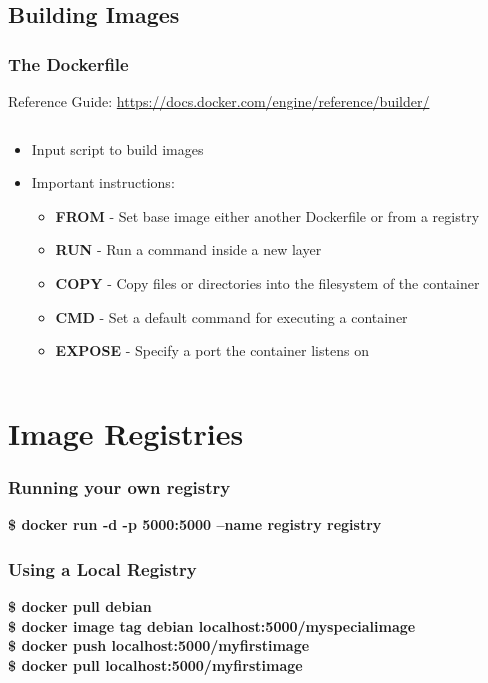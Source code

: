 \documentclass[aspectratio=169,11pt,hyperref={colorlinks=true}]{beamer}
\begin{document}
\subsection{Building Images}
\begin{frame}
    \frametitle{The Dockerfile}
    Reference Guide: \href{https://docs.docker.com/engine/reference/builder/}{https://docs.docker.com/engine/reference/builder/}
    \begin{columns}[T]
        \begin{column}{.41\textwidth}
            \begin{itemize}
                \item Input script to build images
                \item Important instructions:
                \begin{itemize}
                    \item \textbf{FROM} - Set base image either another Dockerfile or from a registry
                    \item \textbf{RUN} - Run a command inside a new layer
                    \item \textbf{COPY} - Copy files or directories into the filesystem of the container
                    \item \textbf{CMD} - Set a default command for executing a container
                    \item \textbf{EXPOSE} - Specify a port the container listens on
                \end{itemize}
            \end{itemize}
        \end{column}
        \begin{column}{.55\textwidth}
            \inputminted[fontsize=\scriptsize,breaklines,]{dockerfile}{examples/uwsgi/Dockerfile}
        \end{column}
    \end{columns}
\end{frame}


\section{Image Registries}
\begin{frame}
    \frametitle{Running your own registry}
    \textbf{\$ docker run -d -p 5000:5000 --name registry registry}
\end{frame}

\begin{frame}
    \frametitle{Using a Local Registry}
    \textbf{\$ docker pull debian} \\
    \textbf{\$ docker image tag debian localhost:5000/myspecialimage} \\
    \textbf{\$ docker push localhost:5000/myfirstimage} \\
    \textbf{\$ docker pull localhost:5000/myfirstimage} 
\end{frame}
\end{document}
